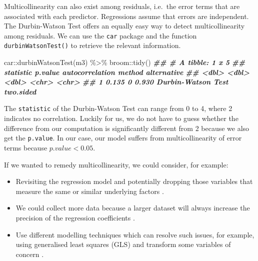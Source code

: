 \documentclass[
]{book}
\newenvironment{Shaded}{\begin{snugshade}}{\end{snugshade}}
\newcommand{\DocumentationTok}[1]{\textcolor[rgb]{0.56,0.35,0.01}{\textbf{\textit{#1}}}}
\newcommand{\FunctionTok}[1]{\textcolor[rgb]{0.00,0.00,0.00}{#1}}
\newcommand{\NormalTok}[1]{#1}
\newcommand{\SpecialCharTok}[1]{\textcolor[rgb]{0.00,0.00,0.00}{#1}}
\begin{document}
Multicollinearity can also exist among residuals, i.e.~the error terms that are associated with each predictor. Regressions assume that errors are independent. The Durbin-Watson Test offers an equally easy way to detect multicollinearity among residuals. We can use the \texttt{car} package and the function \texttt{durbinWatsonTest()} to retrieve the relevant information.

\begin{Shaded}
\begin{Highlighting}[]
\NormalTok{car}\SpecialCharTok{::}\FunctionTok{durbinWatsonTest}\NormalTok{(m3) }\SpecialCharTok{\%\textgreater{}\%}
\NormalTok{  broom}\SpecialCharTok{::}\FunctionTok{tidy}\NormalTok{()}
\DocumentationTok{\#\# \# A tibble: 1 x 5}
\DocumentationTok{\#\#   statistic p.value autocorrelation method             alternative}
\DocumentationTok{\#\#       \textless{}dbl\textgreater{}   \textless{}dbl\textgreater{}           \textless{}dbl\textgreater{} \textless{}chr\textgreater{}              \textless{}chr\textgreater{}      }
\DocumentationTok{\#\# 1     0.135       0           0.930 Durbin{-}Watson Test two.sided}
\end{Highlighting}
\end{Shaded}

The \texttt{statistic} of the Durbin-Watson Test can range from 0 to 4, where 2 indicates no correlation. Luckily for us, we do not have to guess whether the difference from our computation is significantly different from 2 because we also get the \texttt{p.value}. In our case, our model suffers from multicollinearity of error terms because \(p.value < 0.05\).

If we wanted to remedy multicollinearity, we could consider, for example:

\begin{itemize}
\item
  Revisiting the regression model and potentially dropping those variables that measure the same or similar underlying factors \citep{cohen2014applied}.
\item
  We could collect more data because a larger dataset will always increase the precision of the regression coefficients \citep{cohen2014applied}.
\item
  Use different modelling techniques \citep{cohen2014applied} which can resolve such issues, for example, using generalised least squares (GLS) and transform some variables of concern \citep{sage-methods2004dbw}.
\end{itemize}
\end{document}
